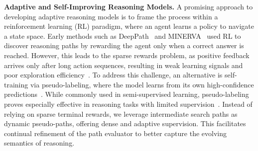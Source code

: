 \noindent\textbf{Adaptive and Self-Improving Reasoning Models.} A promising approach to developing adaptive reasoning models is to frame the process within a reinforcement learning (RL) paradigm, where an agent learns a policy to navigate a state space. Early methods such as DeepPath~\citep{xiong2017deeppath} and MINERVA~\citep{das2018go} used RL to discover reasoning paths by rewarding the agent only when a correct answer is reached. However, this leads to the sparse rewards problem, as positive feedback arrives only after long action sequences, resulting in weak learning signals and poor exploration efficiency~\citep{zhai2024fine,chang2023learning}. To address this challenge, an alternative is self-training via pseudo-labeling, where the model learns from its own high-confidence predictions~\citep{lee2013pseudo,xie2020self}. While commonly used in semi-supervised learning, pseudo-labeling proves especially effective in reasoning tasks with limited supervision~\citep{wang2022semi,huang2025mllm}. Instead of relying on sparse terminal rewards, we leverage intermediate search paths as dynamic pseudo-paths, offering dense and adaptive supervision. This facilitates continual refinement of the path evaluator to better capture the evolving semantics of reasoning.